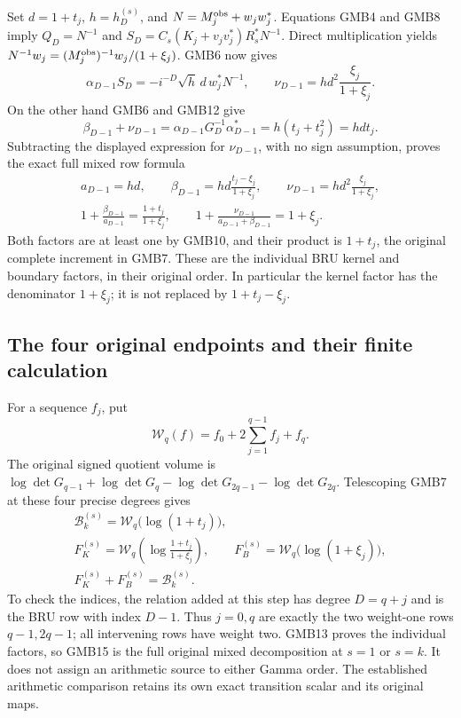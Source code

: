 \documentclass[11pt,a4paper]{article}
\begin{document}
Set $d=1+t_j$, $h=h_D^{(s)}$, and
$N=M_j^{\rm obs}+w_jw_j^*$. Equations GMB4 and GMB8 imply
$Q_D=N^{-1}$ and
$S_D=C_s(K_j+v_jv_j^*)R_s^*N^{-1}$. Direct multiplication yields
$N^{-1}w_j=(M_j^{\rm obs})^{-1}w_j/(1+\xi_j)$.
GMB6 now gives
\[
 \alpha_{D-1}S_D
 =-i^{-D}\sqrt h\,d\,w_j^*N^{-1},\qquad
 \nu_{D-1}=h d^2\frac{\xi_j}{1+\xi_j}.
\]
On the other hand GMB6 and GMB12 give
\[
 \beta_{D-1}+\nu_{D-1}
   =\alpha_{D-1}G_D^{-1}\alpha_{D-1}^*
   =h(t_j+t_j^2)=h d t_j.
\]
Subtracting the displayed expression for $\nu_{D-1}$, with no
sign assumption, proves the exact full mixed row formula
\[
\boxed{\begin{gathered}
 a_{D-1}=h d,\qquad
 \beta_{D-1}=h d\frac{t_j-\xi_j}{1+\xi_j},\qquad
 \nu_{D-1}=h d^2\frac{\xi_j}{1+\xi_j},\\
 1+\frac{\beta_{D-1}}{a_{D-1}}
      =\frac{1+t_j}{1+\xi_j},\qquad
 1+\frac{\nu_{D-1}}{a_{D-1}+\beta_{D-1}}=1+\xi_j.
\end{gathered}}\tag{GMB13}
\]
Both factors are at least one by GMB10, and their product is
$1+t_j$, the original complete increment in GMB7. These are the
individual BRU kernel and boundary factors, in their original
order. In particular the kernel factor has the denominator
$1+\xi_j$; it is not replaced by $1+t_j-\xi_j$.

\subsection{The four original endpoints and their finite calculation}
For a sequence $f_j$, put
\[
 \mathcal W_q(f)=f_0+2\sum_{j=1}^{q-1}f_j+f_q.
 \tag{GMB14}
\]
The original signed quotient volume is
$\log\det G_{q-1}+\log\det G_q
 -\log\det G_{2q-1}-\log\det G_{2q}$.
Telescoping GMB7 at these four precise degrees gives
\[
\begin{gathered}
 \mathcal B_k^{(s)}=\mathcal W_q\bigl(\log(1+t_j)\bigr),\\
 F_{K}^{(s)}=\mathcal W_q\left(
                    \log\frac{1+t_j}{1+\xi_j}\right),\qquad
 F_{B}^{(s)}=\mathcal W_q\bigl(\log(1+\xi_j)\bigr),\\
 F_{K}^{(s)}+F_{B}^{(s)}=\mathcal B_k^{(s)}.
\end{gathered}\tag{GMB15}
\]
To check the indices, the relation added at this step has degree
$D=q+j$ and is the BRU row with index $D-1$. Thus $j=0,q$
are exactly the two weight-one rows $q-1,2q-1$; all intervening
rows have weight two. GMB13 proves the individual factors, so
GMB15 is the full original mixed decomposition at $s=1$ or $s=k$.
It does not assign an arithmetic source to either Gamma order.
The established arithmetic comparison retains its own exact
transition scalar and its original maps.
\end{document}
